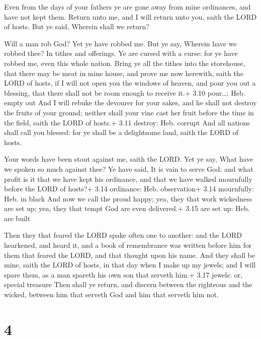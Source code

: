  Even from the days of your fathers ye are gone away from
mine ordinances, and have not kept them. Return unto me, and I will
return unto you, saith the LORD of hosts. But ye said, Wherein shall we
return?

 Will a man rob God? Yet ye have robbed me. But ye say,
Wherein have we robbed thee? In tithes and offerings.  Ye
are cursed with a curse: for ye have robbed me, even this whole nation.
 Bring ye all the tithes into the storehouse, that there
may be meat in mine house, and prove me now herewith, saith the LORD of
hosts, if I will not open you the windows of heaven, and pour you out a
blessing, that there shall not be room enough to receive it.+ 3.10
pour\ldots: Heb. empty out  And I will rebuke the devourer
for your sakes, and he shall not destroy the fruits of your ground;
neither shall your vine cast her fruit before the time in the field,
saith the LORD of hosts.+ 3.11 destroy: Heb. corrupt  And
all nations shall call you blessed: for ye shall be a delightsome land,
saith the LORD of hosts.

 Your words have been stout against me, saith the LORD.
Yet ye say, What have we spoken so much against thee?  Ye
have said, It is vain to serve God: and what profit is it that we have
kept his ordinance, and that we have walked mournfully before the LORD
of hosts?+ 3.14 ordinance: Heb. observation+ 3.14 mournfully: Heb. in
black  And now we call the proud happy; yea, they that work
wickedness are set up; yea, they that tempt God are even delivered.+
3.15 are set up: Heb. are built

 Then they that feared the LORD spake often one to
another: and the LORD hearkened, and heard it, and a book of remembrance
was written before him for them that feared the LORD, and that thought
upon his name.  And they shall be mine, saith the LORD of
hosts, in that day when I make up my jewels; and I will spare them, as a
man spareth his own son that serveth him.+ 3.17 jewels: or, special
treasure  Then shall ye return, and discern between the
righteous and the wicked, between him that serveth God and him that
serveth him not.

\hypertarget{section-3}{%
\section{4}\label{section-3}}


